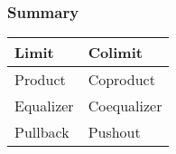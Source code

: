 \documentclass{beamer}
\begin{document}
\begin{frame}
  \frametitle{Summary}
    \begin{table}
    \begin{tabular}{l | l}
      Limit & Colimit \\ \hline
      Product & Coproduct \\
      Equalizer & Coequalizer \\
      Pullback & Pushout
    \end{tabular}
    \end{table}
\end{frame}
\end{document}
